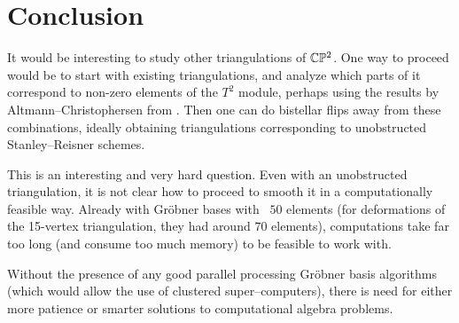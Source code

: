 \section{Conclusion}

It would be interesting to study other triangulations of $\mathbb{C} \mathbb{P}^2$. One way to proceed would be to start with existing triangulations, and analyze which parts of it correspond to non-zero elements of the $T^2$ module, perhaps using the results by Altmann--Christophersen from \cite{deforming_christophersen}. Then one can do bistellar flips away from these combinations, ideally obtaining triangulations corresponding to unobstructed Stanley--Reisner schemes.

This is an interesting and very hard question. Even with an unobstructed triangulation, it is not clear how to proceed to smooth it in a computationally feasible way. Already with Gröbner bases with ~$50$ elements (for deformations of the 15-vertex triangulation, they had around $70$ elements), computations take far too long (and consume too much memory) to be feasible to work with.

Without the presence of any good parallel processing Gröbner basis algorithms (which would allow the use of clustered super--computers), there is need for either more patience or smarter solutions to computational algebra problems.